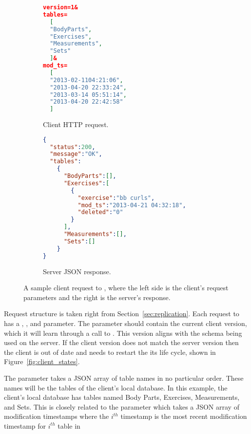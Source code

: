 \begin{figure}[h!]
\begin{subfigure}[b]{0.23\textwidth}
\begin{lstlisting}[language=json]
version=1&
tables=
  [
  "BodyParts",
  "Exercises",
  "Measurements",
  "Sets"
  ]&
mod_ts=
  [
  "2013-02-1104:21:06",
  "2013-04-20 22:33:24",
  "2013-03-14 05:51:14",
  "2013-04-20 22:42:58"
  ]
\end{lstlisting}
\caption{Client HTTP request.}
\end{subfigure}%
\begin{subfigure}[b]{0.27\textwidth}
\begin{lstlisting}[language=json]
{
  "status":200,
  "message":"OK",
  "tables":
    {
      "BodyParts":[],
      "Exercises":[
        {
          "exercise":"bb curls",
          "mod_ts":"2013-04-21 04:32:18",
          "deleted":"0"
        }
      ],
      "Measurements":[],
      "Sets":[]
    }
}
\end{lstlisting}
\caption{Server JSON response.}
\label{fig:request_sync_response}
\end{subfigure}
\caption{A sample client request to \sync, where the left side is the client's
request parameters and the right is the server's response.}
\label{fig:request_sync} 
\end{figure}

Request structure is taken right from Section~\ref{sec:replication}. Each
request to \sync has a , , and 
parameter. The  parameter should contain the current client
version, which it will learn through a call to \schema. This version aligns
with the schema being used on the server. If the client version does not match
the server version then the client is out of date and needs to restart the
its life cycle, shown in Figure~\ref{fig:client_states}.

The  parameter takes a JSON array of table names in no particular
order. These names will be the tables of the client's local database. In this
example, the client's local database has tables named Body Parts, Exercises,
Measurements, and Sets. This is closely related to the  parameter
which takes a JSON array of modification timestamps where the $i^{th}$ timestamp is
the most recent modification timestamp for $i^{th}$ table in 

